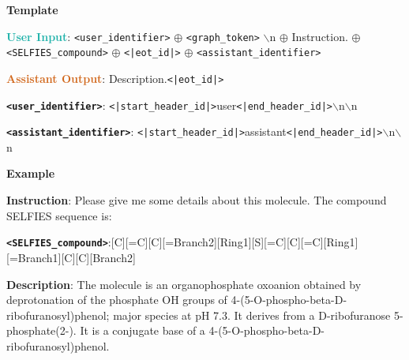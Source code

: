 \begin{tcolorbox}[colback=white!98!black,colframe=white!30!black,boxsep=1.1pt,top=6.75pt]%
\scriptsize
\noindent\makebox[\textwidth]{\rule{\textwidth}{1pt}}
\textbf{Template}
\\[-0.575em]
\noindent\makebox[\textwidth]{\rule{\textwidth}{1pt}}

\textbf{\textcolor[HTML]{20B2AA}{User Input}}: {\tt <user\_identifier>} $\oplus$ {\tt <graph\_token>} $\backslash$n $\oplus$ Instruction. $\oplus$ {\tt <SELFIES\_compound>} $\oplus$ {\tt <|eot\_id|>} $\oplus$ {\tt <assistant\_identifier>}

\textbf{\textcolor[HTML]{D2691E}{Assistant Output}}: Description.{\tt <|eot\_id|>}

{\tt \textbf{<user\_identifier>}}: {\tt <|start\_header\_id|>}user{\tt <|end\_header\_id|>}$\backslash$n$\backslash$n

{\tt \textbf{<assistant\_identifier>}}: {\tt <|start\_header\_id|>}assistant{\tt <|end\_header\_id|>}$\backslash$n$\backslash$n

\noindent\makebox[\textwidth]{\rule{\textwidth}{1pt}}
\textbf{Example}
\\[-0.575em]
\noindent\makebox[\textwidth]{\rule{\textwidth}{1pt}}

\begin{tcolorbox}[colback=cyan!7!white,colframe=white!98!black,boxsep=1.1pt,top=6.75pt]
\textbf{Instruction}: Please give me some details about this molecule. The compound SELFIES sequence is:

{\tt \textbf{<SELFIES\_compound>}}:[C][=C][C][=Branch2][Ring1][S][=C][C][=C][Ring1][=Branch1][C][C][Branch2]\-[Ring1][Branch1][C][Branch1][P][C] [Branch1][Ring2][O][Ring1][Branch1][C][O][P][=Branch1][C][=O]\-[Branch1][C][O-1][O-1][O][O][O]

\end{tcolorbox}

\begin{tcolorbox}[colback=orange!7!white,colframe=white!98!black,boxsep=1.1pt,top=6.75pt]
\textbf{Description}: The molecule is an organophosphate oxoanion obtained by deprotonation of the phosphate OH groups of 4-(5-O-phospho-beta-D-ribofuranosyl)phenol; major species at pH 7.3. It derives from a D-ribofuranose 5-phosphate(2-). It is a conjugate base of a 4-(5-O-phospho-beta-D-ribofuranosyl)phenol.
\end{tcolorbox}

\end{tcolorbox}

